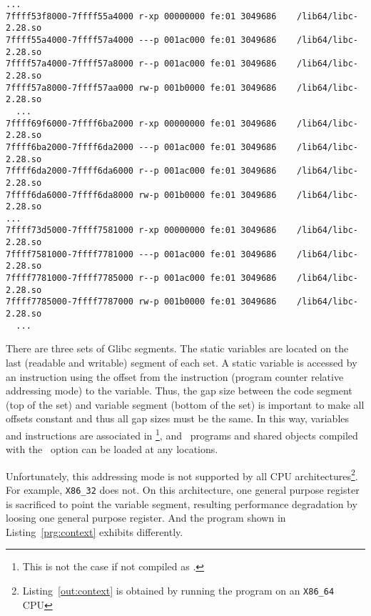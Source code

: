 \begin{lstlisting}[basicstyle=\tiny\tt, frame=tRBl, label=out:glibc-segs]
  ...
7ffff53f8000-7ffff55a4000 r-xp 00000000 fe:01 3049686    /lib64/libc-2.28.so
7ffff55a4000-7ffff57a4000 ---p 001ac000 fe:01 3049686    /lib64/libc-2.28.so
7ffff57a4000-7ffff57a8000 r--p 001ac000 fe:01 3049686    /lib64/libc-2.28.so
7ffff57a8000-7ffff57aa000 rw-p 001b0000 fe:01 3049686    /lib64/libc-2.28.so
  ...
7ffff69f6000-7ffff6ba2000 r-xp 00000000 fe:01 3049686    /lib64/libc-2.28.so
7ffff6ba2000-7ffff6da2000 ---p 001ac000 fe:01 3049686    /lib64/libc-2.28.so
7ffff6da2000-7ffff6da6000 r--p 001ac000 fe:01 3049686    /lib64/libc-2.28.so
7ffff6da6000-7ffff6da8000 rw-p 001b0000 fe:01 3049686    /lib64/libc-2.28.so
...
7ffff73d5000-7ffff7581000 r-xp 00000000 fe:01 3049686    /lib64/libc-2.28.so
7ffff7581000-7ffff7781000 ---p 001ac000 fe:01 3049686    /lib64/libc-2.28.so
7ffff7781000-7ffff7785000 r--p 001ac000 fe:01 3049686    /lib64/libc-2.28.so
7ffff7785000-7ffff7787000 rw-p 001b0000 fe:01 3049686    /lib64/libc-2.28.so
  ...
\end{lstlisting}

There are three sets of Glibc segments. The static variables are
located on the last (readable and writable) segment of each set. A
static variable is accessed by an instruction using the offset from
the instruction (program counter relative addressing mode) to the
variable. Thus, the gap size between the code segment (top of the set)
and variable segment (bottom of the set) is important to make all
offsets constant and thus all gap sizes must be the same. In this way,
variables and instructions are associated in \PIE\footnote{This is
not the case if not compiled as \PIE.}, and \PIE\ programs and shared
objects compiled with the \PIC\ option can be loaded at any locations.

Unfortunately, this addressing mode is not supported by all CPU
architectures\footnote{Listing~\ref{out:context} is obtained by
running the program on an {\tt X86_64} CPU}. For example, {\tt X86_32} 
does not. On this architecture, one general purpose
register is sacrificed to point the variable segment, resulting
performance degradation by loosing one general purpose register. And
the program shown in Listing~\ref{prg:context} exhibits differently. 
